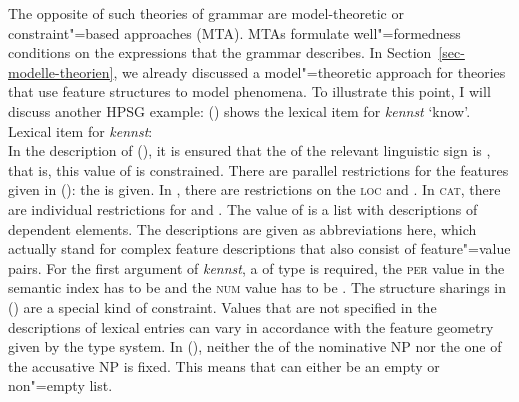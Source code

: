 The opposite of such theories of grammar are model-theoretic or constraint"=based approaches (MTA).
MTAs formulate well"=formedness conditions on the expressions that the grammar describes.
In Section~\ref{sec-modelle-theorien}, we already discussed a model"=theoretic approach for theories that use
feature structures to model phenomena. To illustrate this point, I will discuss another HPSG example:
() shows the lexical item for \emph{kennst} `know'. %
\eas
Lexical item for \emph{kennst}:\\
\label{le-verbspur-kennt-zwei}%
\zs
In the description of (), it is ensured that the \phonv of the relevant linguistic sign is
, that is, this value of \phon is constrained. There are parallel restrictions for the features given in (): the \synsemv
is given. In \synsem, there are restrictions on the \textsc{loc} and \nonlocv. In \textsc{cat}, there are
individual restrictions for \head and \subcat. The value of \subcat is a list with descriptions of dependent
elements. The descriptions are given as abbreviations here, which actually stand for complex feature descriptions that also
consist of feature"=value pairs. For the first argument of \emph{kennst}, a \headv of type 
 is required, the \textsc{per} value in the semantic index has to be  and the
 \textsc{num} value has to be . The structure sharings in () are a special kind of constraint. Values that
 are not specified in the descriptions of lexical entries can vary in accordance with the feature geometry given by the type
 system. In (), neither the \slashv of the nominative NP nor the one of the accusative NP is fixed. This means that \slasch can
 either be an empty or non"=empty list.

